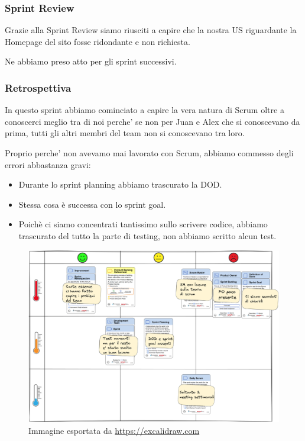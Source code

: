 \documentclass{article}
\begin{document}
\subsubsection{Sprint Review}
Grazie alla Sprint Review siamo riusciti a capire che la nostra US riguardante la Homepage del sito fosse ridondante e non richiesta.

Ne abbiamo preso atto per gli sprint successivi.
\subsubsection{Retrospettiva}
In questo sprint abbiamo cominciato a capire la vera natura di Scrum oltre a conoscerci meglio tra di noi perche' se non per Juan e Alex che si conoscevano da prima, tutti gli altri membri del team non si conoscevano tra loro.

Proprio perche' non avevamo mai lavorato con Scrum, abbiamo commesso degli errori abbastanza gravi:
\begin{itemize}
    \item Durante lo sprint planning abbiamo trascurato la DOD.
    \item Stessa cosa \`e successa con lo sprint goal.
    \item Poich\`e ci siamo concentrati tantissimo sullo scrivere codice, abbiamo trascurato del tutto la parte di testing, non abbiamo scritto alcun test.
\end{itemize}
\begin{figure}[H]
    \centering
    \includegraphics[scale=0.065]{retrospettive/retrospettiva-sprint1.png}
    \caption{Immagine esportata da \href{https://excalidraw.com/}{https://excalidraw.com}}
    \label{fig:retrospettiva1}
\end{figure}
\end{document}
